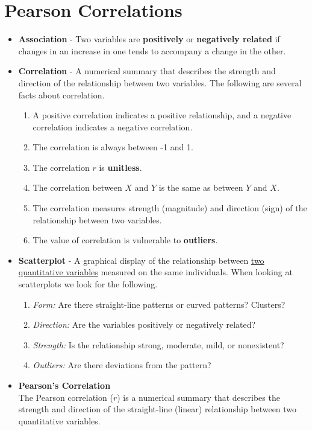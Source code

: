 \documentclass{article}
\begin{document}
\section{Pearson Correlations}
  \begin{itemize}
    \item \textbf{Association} - Two variables are \textbf{positively} or \textbf{negatively related} if changes in an increase in one tends to accompany a change in the other.
    \item \textbf{Correlation} - A numerical summary that describes the strength and direction of the relationship between two variables. The following are several facts about correlation.
      \begin{enumerate}
        \item A positive correlation indicates a positive relationship, and a negative correlation indicates a negative correlation.
        \item The correlation is always between -1 and 1.
        \item The correlation $r$ is \textbf{unitless}.
        \item The correlation between $X$ and $Y$ is the same as between $Y$ and $X$.
        \item The correlation measures strength (magnitude) and direction (sign) of the relationship between two variables.
        \item The value of correlation is vulnerable to \textbf{outliers}.
      \end{enumerate}
      \item \textbf{Scatterplot} - A graphical display of the relationship between \underline{two quantitative variables} measured on the same individuals. When looking at scatterplots we look for the following.
        \begin{enumerate}
          \item \emph{Form:} Are there straight-line patterns or curved patterns? Clusters?
          \item \emph{Direction:} Are the variables positively or negatively related?
          \item \emph{Strength:} Is the relationship strong, moderate, mild, or nonexistent?
          \item \emph{Outliers:} Are there deviations from the pattern?
        \end{enumerate}
        \item \textbf{Pearson's Correlation}
        \\ The Pearson correlation ($r$) is a numerical summary that describes the strength and direction of the straight-line (linear) relationship between two quantitative variables.

\end{itemize}
\end{document}
